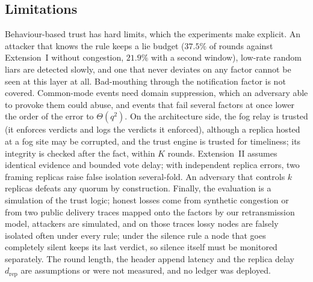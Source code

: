 \subsection{Limitations}
Behaviour-based trust has hard limits, which the experiments make
explicit.  An attacker that knows the rule keeps a lie budget
($37.5\%$ of rounds against Extension~I without congestion,
$21.9\%$ with a second window), low-rate random liars are detected
slowly, and one that never deviates on any factor cannot be seen at
this layer at all.  Bad-mouthing through the notification factor is
not covered.  Common-mode events need domain suppression, which an
adversary able to provoke them could abuse, and events that fail
several factors at once lower the order of the error to
$\Theta(q^{2})$.  On the architecture side, the fog relay is trusted
(it enforces verdicts and logs the verdicts it enforced), although a
replica hosted at a fog site may be corrupted, and the trust engine is
trusted for timeliness; its integrity is checked after the fact,
within $K$ rounds.  Extension~II assumes identical evidence and
bounded vote delay; with independent replica errors, two framing
replicas raise false isolation several-fold.  An adversary that controls
$k$ replicas defeats any quorum by construction.  Finally, the
evaluation is a simulation of the trust logic; honest losses come from
synthetic congestion or from two public delivery traces mapped onto the
factors by our retransmission model, attackers are simulated, and on
those traces lossy nodes are falsely isolated often under every rule;
under the silence rule a node that goes completely silent keeps its
last verdict, so silence itself must be monitored separately.
The round length, the header append
latency and the replica delay $d_{\mathrm{rep}}$ are assumptions or
were not measured, and no ledger was deployed.
